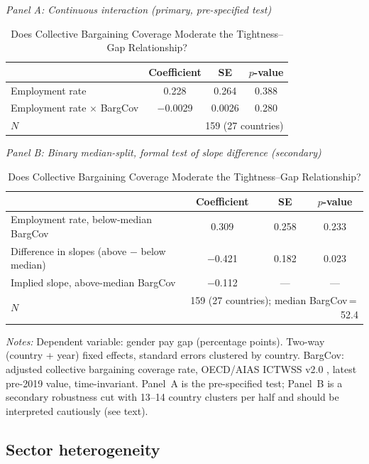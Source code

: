 \documentclass[12pt,a4paper]{article}
\begin{document}
\begin{table}[htbp]
\caption{Does Collective Bargaining Coverage Moderate the Tightness--Gap
         Relationship?}
\label{tab:bargaining}
\begin{threeparttable}
\smallskip
\textit{Panel A: Continuous interaction (primary, pre-specified test)}
\smallskip
\begin{tabular}{lccc}
\toprule
 & Coefficient & SE & $p$-value \\
\midrule
Employment rate                          & 0.228    & 0.264  & 0.388 \\
Employment rate $\times$ BargCov         & $-$0.0029 & 0.0026 & 0.280 \\
\midrule
$N$ & \multicolumn{3}{r}{159 (27 countries)} \\
\bottomrule
\end{tabular}

\bigskip
\textit{Panel B: Binary median-split, formal test of slope difference (secondary)}
\smallskip
\begin{tabular}{lccc}
\toprule
 & Coefficient & SE & $p$-value \\
\midrule
Employment rate, below-median BargCov         & 0.309    & 0.258 & 0.233 \\
Difference in slopes (above $-$ below median) & $-$0.421 & 0.182 & 0.023 \\
Implied slope, above-median BargCov           & $-$0.112 & ---   & --- \\
\midrule
$N$ & \multicolumn{3}{r}{159 (27 countries); median BargCov\,=\,52.4} \\
\bottomrule
\end{tabular}
\begin{tablenotes}
\footnotesize
\item \textit{Notes:} Dependent variable: gender pay gap (percentage points).
  Two-way (country + year) fixed effects, standard errors clustered by
  country.  BargCov: adjusted collective bargaining coverage rate,
  OECD/AIAS ICTWSS v2.0 \citep{OECDAIAS2025}, latest pre-2019 value,
  time-invariant.  Panel~A is the pre-specified test; Panel~B is a secondary
  robustness cut with 13--14 country clusters per half and should be
  interpreted cautiously (see text).
\end{tablenotes}
\end{threeparttable}
\end{table}

\subsection{Sector heterogeneity}
\label{subsec:sector}
\end{document}
